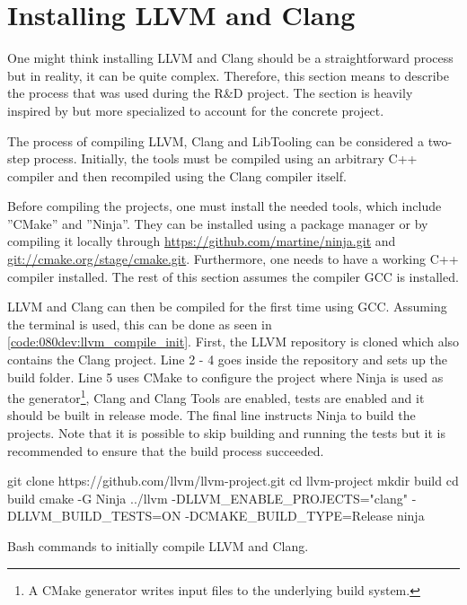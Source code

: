 \section{Installing LLVM and Clang}
One might think installing LLVM and Clang should be a straightforward process but in reality, it can be quite complex. Therefore, this section means to describe the process that was used during the R\&D project. The section is heavily inspired by \cite{TutorialBuildingTools} but more specialized to account for the concrete project.

The process of compiling LLVM, Clang and LibTooling can be considered a two-step process. Initially, the tools must be compiled using an arbitrary C++ compiler and then recompiled using the Clang compiler itself.

Before compiling the projects, one must install the needed tools, which include ''CMake'' and ''Ninja''. They can be installed using a package manager or by compiling it locally through \url{https://github.com/martine/ninja.git} and \url{git://cmake.org/stage/cmake.git}. Furthermore, one needs to have a working C++ compiler installed. The rest of this section assumes the compiler GCC is installed.


LLVM and Clang can then be compiled for the first time using GCC. Assuming the terminal is used, this can be done as seen in \cref{code:080dev:llvm_compile_init}.
First, the LLVM repository is cloned which also contains the Clang project.
Line 2 - 4 goes inside the repository and sets up the build folder.
Line 5 uses CMake to configure the project where Ninja is used as the generator\footnote{A CMake generator writes input files to the underlying build system.\cite{CmakegeneratorsCMake26}}, Clang and Clang Tools are enabled, tests are enabled and it should be built in release mode. The final line instructs Ninja to build the projects. Note that it is possible to skip building and running the tests but it is recommended to ensure that the build process succeeded.

\begin{listing}[H]
    \begin{bashcode}
git clone https://github.com/llvm/llvm-project.git
cd llvm-project
mkdir build
cd build
cmake -G Ninja ../llvm -DLLVM_ENABLE_PROJECTS="clang" -DLLVM_BUILD_TESTS=ON -DCMAKE_BUILD_TYPE=Release
ninja
    \end{bashcode}
    \caption{Bash commands to initially compile LLVM and Clang.}
    \label{code:080dev:llvm_compile_init}
\end{listing}

